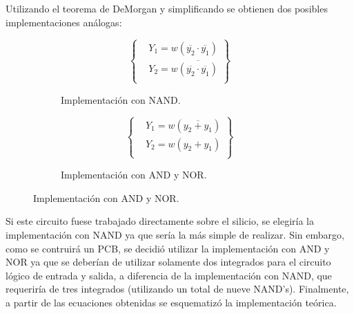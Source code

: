 Utilizando el teorema de DeMorgan y simplificando se obtienen dos posibles implementaciones análogas:
\begin{figure}[H]
\begin{subfigure}{0.49\textwidth}
\vspace*{-0.17cm}
\begin{equation*}
\left.\left\{
\begin{aligned}
		& Y_1 = w(\overline{y_2}\cdot \overline{y_1})	 \\		
		& Y_2 = w\overline{(\overline{y_2}\cdot \overline{y_1})}\\		
\end{aligned}
\right.\right\}
\end{equation*}
\caption{Implementación con NAND.}
\end{subfigure}
\begin{subfigure}{0.49\textwidth}
\begin{equation*}
\left.\left\{
\begin{aligned}
		& Y_1 = w(\overline{y_2+y_1}) \\		
		& Y_2 = w(y_2+y_1)\\		
\end{aligned}
\right.\right\}
\end{equation*}
\caption{Implementación con AND y NOR.}
\end{subfigure}
\end{figure}

Si este circuito fuese trabajado directamente sobre el silicio, se elegiría la implementación con NAND ya que sería la más simple de realizar. Sin embargo, como se contruirá un PCB, se decidió utilizar la implementación con AND y NOR ya que se deberían de utilizar solamente dos integrados para el circuito lógico de entrada y salida, a diferencia de la implementación con NAND, que requeriría de tres integrados (utilizando un total de nueve NAND's). Finalmente, a partir de las ecuaciones obtenidas se esquematizó la implementación teórica.


